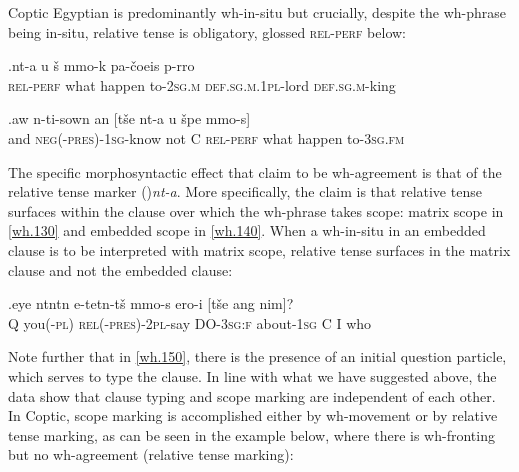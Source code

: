 \documentclass{glossa}
\begin{document}
Coptic Egyptian is predominantly wh-in-situ but crucially, despite the wh-phrase being in-situ, relative tense is obligatory, glossed \textsc{rel-perf} below:

\exg.\label{wh.130}{\textschwa}nt-a u \v{s}{\textopeno} {\textschwa}mmo-k pa-\v{c}oeis p-{\textschwa}rro\\
   \textsc{rel-perf} what happen to-\textsc{2sg.m} \textsc{def.sg.m.1pl}-lord \textsc{def.sg.m}-king\\

\exg.\label{wh.140}aw{\textopeno} n-ti-sown an [t\v{s}e nt-a u \v{s}{\textopeno}pe {\textschwa}mmo-s]\\
   and \textsc{neg(-pres)-1sg}-know not C \textsc{rel-perf} what happen to-\textsc{3sg.fm}\\

The specific morphosyntactic effect that \cite{rlc:2006} claim to be wh-agreement is that of the relative tense marker (\textschwa)\textit{nt-a}. More specifically, the claim is that relative tense surfaces within the clause over which the wh-phrase takes scope: matrix scope in \ref{wh.130} and embedded scope in \ref{wh.140}. When a wh-in-situ in an embedded clause is to be interpreted with matrix scope, relative tense surfaces in the matrix clause and not the embedded clause:

\exg.\label{wh.150}eye {\textschwa}nt{\textopeno}nt{\textschwa}n e-tet{\textschwa}n-t\v{s}{\textopeno} {\textschwa}mmo-s ero-i [t\v{s}e ang nim]?\\
   Q you(\textsc{-pl}) \textsc{rel(-pres)-2pl}-say DO-\textsc{3sg:f} about-\textsc{1sg} C I who\\

Note further that in \ref{wh.150}, there is the presence of an initial question particle, which serves to type the clause. In line with what we have suggested above, the data show that clause typing and scope marking are independent of each other. In Coptic, scope marking is accomplished either by wh-movement or by relative tense marking, as can be seen in the example below, where there is wh-fronting but no wh-agreement (relative tense marking):

%
%
\end{document}
